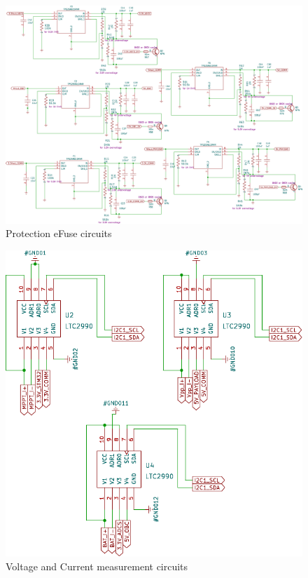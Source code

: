    \begin{figure}[H]
 	\centering
 	\includegraphics[width=0.99\columnwidth]{FrontMatter/pcb-ProtectionCircuit.pdf}
 	\caption{\centering Protection eFuse circuits}
 	\label{fig:protecc 4lr}
 \end{figure}

  \begin{figure}[H]
 	\centering
 	\includegraphics[width=0.99\columnwidth]{FrontMatter/pcb-MeasurementCircuit.pdf}
 	\caption{\centering Voltage and Current measurement circuits}
 	\label{fig:mes 4lr}
 \end{figure}
 
